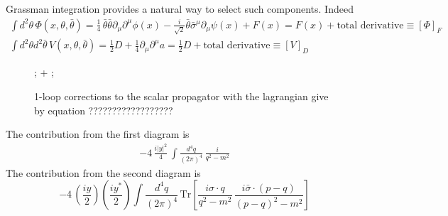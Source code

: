\documentclass[12pt]{article}
\begin{document}
\newpage

Grassman integration provides a natural way to select such components. Indeed 
\begin{gather*}
  \int d^2\theta \, \Phi(x, \theta, \bar\theta) = \frac{1}{4} \, \bar\theta \bar\theta \partial_\mu \partial^\mu \phi(x) - \frac{i}{\sqrt{2}} \bar\theta \bar\sigma^\mu \partial_\mu \psi(x) + F(x) = F(x) + \text{total derivative} \equiv \left[\Phi\right]_F \\
  \int d^2\theta d^2\bar\theta \, V(x, \theta, \bar\theta) = \frac{1}{2} D + \frac{1}{4} \partial_\mu \partial^\mu a = \frac{1}{2} D + \text{total derivative} \equiv \left[V\right]_D
\end{gather*}


\newpage

\begin{figure}[h]
  \centering 
  ; 
\quad + \qquad
{};
\caption{1-loop corrections to the scalar propagator with the lagrangian give by equation ??????????????????}
\end{figure}
\raggedright The contribution from the first diagram is
\begin{gather*}
  -4 \,\frac{i|y|^2}{4} \, \int \frac{d^4 q}{(2\pi)^4} \, \frac{i}{q^2 - m^2}
\end{gather*}
The contribution from the second diagram is 
\begin{equation*}
  - 4 \, \left(\frac{iy}{2}\right)\left(\frac{iy^*}{2}\right) \int \frac{d^4 q}{(2\pi)^4} \, \text{Tr}\left[\frac{i\sigma \cdot q}{q^2 - m^2} \, \frac{i\bar\sigma \cdot (p-q)}{(p-q)^2 - m^2}\right]
\end{equation*}
\end{document}
